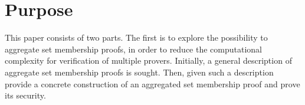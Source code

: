 






\section*{Purpose}
This paper consists of two parts. The first is to explore the possibility to aggregate set membership proofs, in order to reduce the computational complexity for verification of multiple provers. Initially, a general description of aggregate set membership proofs is sought. Then, given such a description provide a concrete construction of an aggregated set membership proof and prove its security.

